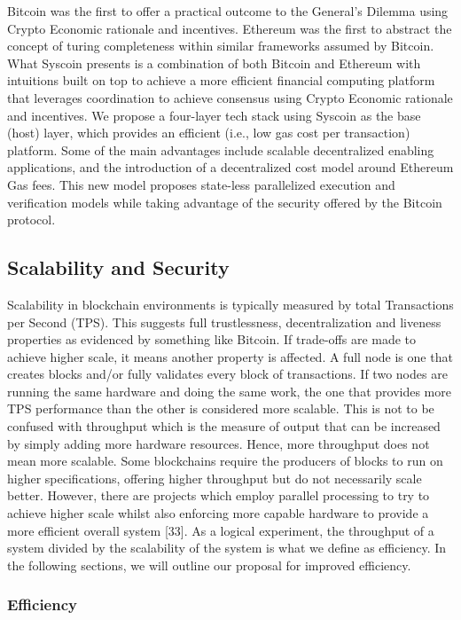 \documentclass[peerreview]{ieeesyscoin}
\begin{document}
Bitcoin was the first to offer a practical outcome to the General's Dilemma using Crypto Economic rationale and incentives. Ethereum was the first to abstract the concept of turing completeness within similar frameworks assumed by Bitcoin. What Syscoin presents is a combination of both Bitcoin and Ethereum with intuitions built on top to achieve a more efficient financial computing platform that leverages coordination to achieve consensus using Crypto Economic rationale and incentives. We propose a four-layer tech stack using Syscoin as the base (host) layer, which provides an efficient (i.e., low gas cost per transaction) platform. Some of the main advantages include scalable decentralized enabling applications, and the introduction of a decentralized cost model around Ethereum Gas fees. This new model proposes state-less parallelized execution and verification models while taking advantage of the security offered by the Bitcoin protocol. 

\subsection{Scalability and Security}

Scalability in blockchain environments is typically measured by total Transactions per Second (TPS). This suggests full trustlessness, decentralization and liveness properties as evidenced by something like Bitcoin. If trade-offs are made to achieve higher scale, it means another property is affected. A full node is one that creates blocks and/or fully validates every block of transactions. If two nodes are running the same hardware and doing the same work, the one that provides more TPS performance than the other is considered more scalable. This is not to be confused with throughput which is the measure of output that can be increased by simply adding more hardware resources. Hence, more throughput does not mean more scalable. Some blockchains require the producers of blocks to run on higher specifications, offering higher throughput but do not necessarily scale better. However, there are projects which employ parallel processing to try to achieve higher scale whilst also enforcing more capable hardware to provide a more efficient overall system [33]. As a logical experiment, the throughput of a system divided by the scalability of the system is what we define as efficiency. In the following sections, we will outline our proposal for improved efficiency.

\subsubsection{Efficiency}
\end{document}
